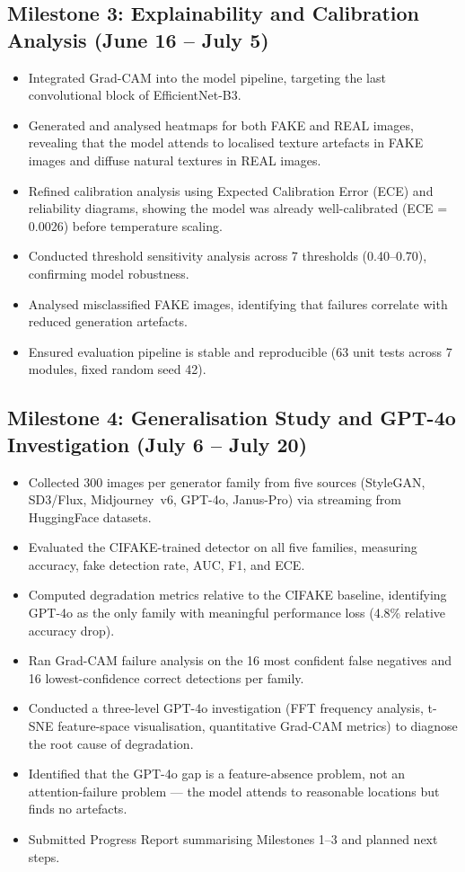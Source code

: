 \documentclass[12pt,a4paper]{article}
\begin{document}
\subsection{Milestone 3: Explainability and Calibration Analysis (June 16 -- July 5)}

\begin{itemize}[noitemsep]
    \item Integrated Grad-CAM into the model pipeline, targeting the last convolutional block of EfficientNet-B3.
    \item Generated and analysed heatmaps for both FAKE and REAL images, revealing that the model attends to localised texture artefacts in FAKE images and diffuse natural textures in REAL images.
    \item Refined calibration analysis using Expected Calibration Error (ECE) and reliability diagrams, showing the model was already well-calibrated (ECE = 0.0026) before temperature scaling.
    \item Conducted threshold sensitivity analysis across 7 thresholds (0.40--0.70), confirming model robustness.
    \item Analysed misclassified FAKE images, identifying that failures correlate with reduced generation artefacts.
    \item Ensured evaluation pipeline is stable and reproducible (63 unit tests across 7 modules, fixed random seed 42).
\end{itemize}

\subsection{Milestone 4: Generalisation Study and GPT-4o Investigation (July 6 -- July 20)}

\begin{itemize}[noitemsep]
    \item Collected 300 images per generator family from five sources (StyleGAN, SD3/Flux, Midjourney~v6, GPT-4o, Janus-Pro) via streaming from HuggingFace datasets.
    \item Evaluated the CIFAKE-trained detector on all five families, measuring accuracy, fake detection rate, AUC, F1, and ECE.
    \item Computed degradation metrics relative to the CIFAKE baseline, identifying GPT-4o as the only family with meaningful performance loss (4.8\% relative accuracy drop).
    \item Ran Grad-CAM failure analysis on the 16 most confident false negatives and 16 lowest-confidence correct detections per family.
    \item Conducted a three-level GPT-4o investigation (FFT frequency analysis, t-SNE feature-space visualisation, quantitative Grad-CAM metrics) to diagnose the root cause of degradation.
    \item Identified that the GPT-4o gap is a feature-absence problem, not an attention-failure problem --- the model attends to reasonable locations but finds no artefacts.
    \item Submitted Progress Report summarising Milestones 1--3 and planned next steps.
\end{itemize}
\end{document}
